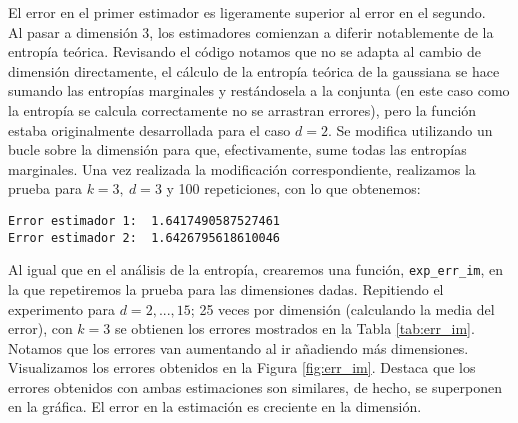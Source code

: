 \documentclass[12pt,a4paper]{report} %
\theoremstyle{definition}
\begin{document}
El error en el primer estimador es ligeramente superior al error en el segundo.\\

Al pasar a dimensión 3, los estimadores comienzan a diferir notablemente de la entropía teórica. Revisando el código notamos que no se adapta al cambio de dimensión directamente, el cálculo de la entropía teórica de la gaussiana se hace sumando las entropías marginales y restándosela a la conjunta (en este caso como la entropía se calcula correctamente no se arrastran errores), pero la función estaba originalmente desarrollada para el caso $d = 2$. Se modifica utilizando un bucle sobre la dimensión para que, efectivamente, sume todas las entropías marginales. Una vez realizada la modificación correspondiente, realizamos la prueba para $k = 3,\ d = 3$ y 100 repeticiones, con lo que obtenemos:\\

\begin{lstlisting}
Error estimador 1:  1.6417490587527461
Error estimador 2:  1.6426795618610046

\end{lstlisting}

Al igual que en el análisis de la entropía, crearemos una función, \texttt{exp\_err\_im}, en la que repetiremos la prueba para las dimensiones dadas. Repitiendo el experimento para $d=2,...,15$; 25 veces por dimensión (calculando la media del error), con $k=3$ se obtienen los errores mostrados en la Tabla \ref{tab:err_im}. Notamos que los errores van aumentando al ir añadiendo más dimensiones. Visualizamos los errores obtenidos en la Figura \ref{fig:err_im}. Destaca que los errores obtenidos con ambas estimaciones son similares, de hecho, se superponen en la gráfica. El error en la estimación es creciente en la dimensión.\\
\end{document}
